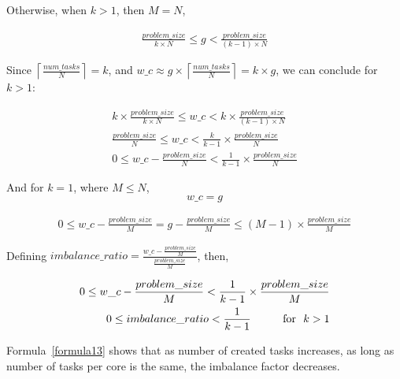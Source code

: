 Otherwise, when $k>1$, then $M=N$, 

\begin{equation}\label{formula10}
\begin{aligned}
\frac{problem\_{size}}{k\times{N}}\leq{g}<\frac{problem\_{size}}{(k-1)\times{N}}
\end{aligned}
\end{equation}

Since $\left \lceil{\frac{num\_{tasks}}{N}}\right \rceil=k$, and $w\_c\approx{g\times\left \lceil{\frac{num\_{tasks}}{N}}\right \rceil}={k\times{g}}$, we can conclude for $k>1$:

\begin{equation}\label{formula11}
\begin{aligned}
k\times{\frac{problem\_{size}}{k\times{N}}}\leq{w\_c}<{k\times{\frac{problem\_{size}}{(k-1)\times{N}}}}\\
\frac{problem\_{size}}{{N}}\leq{w\_c}<{\frac{k}{k-1}\times{\frac{problem\_{size}}{N}}}\\
0\leq{w\_c-\frac{problem\_{size}}{N}}<\frac{1}{k-1}\times{\frac{problem\_{size}}{N}}
\end{aligned}
\end{equation}

And for $k=1$, where $M\leq{N}$,
\begin{equation}\label{formula12}
w\_c=g
\end{equation}

\begin{equation}\label{formula14}
\begin{aligned}
0\leq{w\_c-\frac{problem\_{size}}{M}}={g-\frac{problem\_{size}}{M}}\leq(M-1)\times{\frac{problem\_{size}}{M}}
\end{aligned}
\end{equation}


Defining $imbalance\_{ratio}=\frac{w\_c-\frac{problem\_{size}}{M}}{\frac{problem\_{size}}{M}}$, then,

\begin{equation}\label{formula13}
\begin{aligned}
0\leq{w\_c-\frac{problem\_{size}}{M}}<\frac{1}{k-1}\times{\frac{problem\_{size}}{M}}\\
0\leq{imbalance\_{ratio}}<\frac{1}{k-1}  \text{\:\:\:\:\:\:\:\:\:\:\:\:\:for\:\:\:}k>{1}\\
\end{aligned}
\end{equation}

Formula~\ref{formula13} shows that as number of created tasks increases, as long as number of tasks per core is the same, the imbalance factor decreases. 

